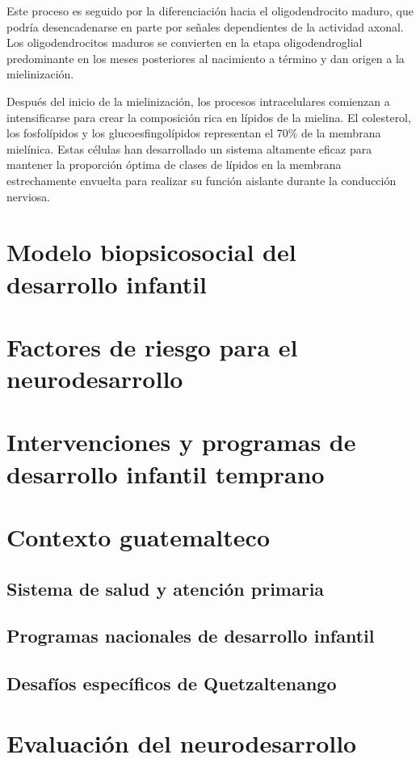 \documentclass[11pt,letterpaper]{report}
\begin{document}
Este proceso es seguido por la diferenciación hacia el oligodendrocito maduro,
que podría desencadenarse en parte por señales dependientes de la actividad
axonal. Los oligodendrocitos maduros se convierten en la etapa oligodendroglial
predominante en los meses posteriores al nacimiento a término y dan origen a la
mielinización. \cite{Polin124}

Después del inicio de la mielinización, los procesos intracelulares comienzan a
intensificarse para crear la composición rica en lípidos de la mielina. El
colesterol, los fosfolípidos y los glucoesfingolípidos representan el 70\% de
la membrana mielínica. Estas células han desarrollado un sistema altamente
eficaz para mantener la proporción óptima de clases de lípidos en la membrana
estrechamente envuelta para realizar su función aislante durante la conducción
nerviosa. \cite{Polin124}

\section{Modelo biopsicosocial del desarrollo infantil}

\section{Factores de riesgo para el neurodesarrollo}

\section{Intervenciones y programas de desarrollo infantil temprano}

\section{Contexto guatemalteco}
\subsection{Sistema de salud y atención primaria}
\subsection{Programas nacionales de desarrollo infantil}
\subsection{Desafíos específicos de Quetzaltenango}

\section{Evaluación del neurodesarrollo}
\end{document}
